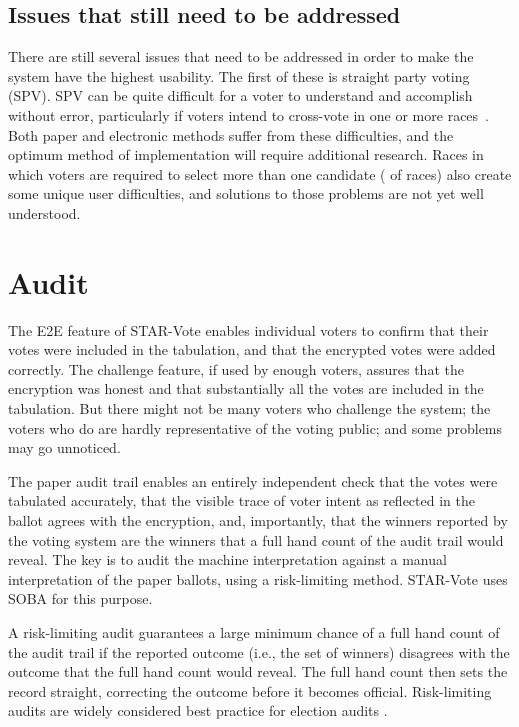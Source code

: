 \documentclass[letterpaper, 10pt, twocolumn]{article}
\newcommand{\projname}{STAR-Vote\xspace}
\begin{document}
\subsection{Issues that still need to be addressed}
There are still several issues that need to be addressed in order to make the system have the highest usability. The first of these is straight party voting (SPV). SPV can be quite difficult for a voter to understand and accomplish without error, particularly if voters intend to cross-vote in one or more races~\cite{campbell-ieee}. Both paper and electronic methods suffer from these difficulties, and the optimum method of implementation will require additional research. Races in which voters are required to select more than one candidate ( of  races) also create some unique user difficulties, and solutions to those problems are not yet well understood. 






\section{Audit}

\label{sec:audit}

The E2E feature of \projname enables individual voters to confirm that their votes were included in the
tabulation, and that the encrypted votes were added correctly.
The challenge feature, if used by enough voters, assures that the encryption was honest
and that substantially all the votes are included in the tabulation.
But there might not be many voters who challenge the system; the voters who do are hardly
representative of the voting public; and some problems may go unnoticed.

The paper audit trail enables an entirely independent check that the votes were tabulated accurately, that
the visible trace of voter intent as reflected in the ballot agrees with the encryption, and, importantly, that
the winners reported by the voting system are the winners that a full hand count of the audit trail would
reveal.
The key is to audit the machine interpretation against a manual interpretation of the paper ballots,
using a risk-limiting method.
\projname uses SOBA \cite{benalohEtal11} for this purpose.

A risk-limiting audit guarantees a large minimum chance of a full hand count of the audit trail if the
reported outcome (i.e., the set of winners) disagrees with the outcome that the full hand count would reveal.
The full hand count then sets the record straight, correcting the outcome before it becomes official.
Risk-limiting audits are widely considered best practice for election audits \cite{bestPractices08}.
\end{document}
